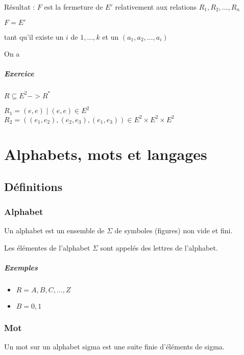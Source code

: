 \documentclass[12pt, a4paper]{report}
\begin{document}
Résultat : $F$ est la fermeture de $E'$ relativement aux relations $R_1, R_2, \dots, R_n$

$F=E'$

tant qu'il existe un $i$ de ${1, \dots, k}$ et un $(a_1, a_2, \dots , a_i)$

On a 

\paragraph{Exercice}

$R \subseteq E^2 -> R^{*}$

$R_1 = { (e,e) \mid (e,e) \in E^2}$
$R_2 = { ((e_1,e_2),(e_2,e_3),(e_1,e_3))  \in E^2 \times E^2 \times E^2 }$



\chapter{Alphabets, mots et langages}

\section{Définitions}

\subsection{Alphabet}

Un alphabet est un ensemble de $\Sigma$ de symboles (figures) non vide et fini.

Les élémentes de l'alphabet $\Sigma$ sont appelés des lettres de l'alphabet.

\paragraph{Exemples}

\begin{itemize}
\item $R = {A, B, C, ..., Z}$
\item $B = {0, 1}$
\end{itemize}

\subsection{Mot}
Un mot sur un alphabet sigma est une suite finie d'éléments de sigma.
\end{document}
